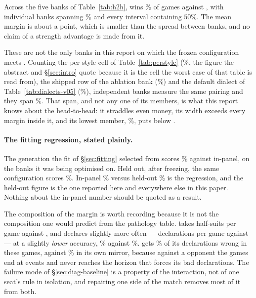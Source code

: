 Across the five banks of Table~\ref{tab:h2h}, \vfive{} wins \numHeadWin\% of
\numHeadGames{} games against \vfour{}, with individual banks spanning
\numHeadRange\% and every interval containing $50\%$. The mean margin is about a
point, which is smaller than the spread between banks, and no claim of a strength
advantage is made from it.

These are not the only banks in this report on which the frozen configuration
meets \vfour{}. Counting the per-style cell of Table~\ref{tab:perstyle}
(\numPanelVfiveVfour\%, the figure the abstract and \S\ref{sec:intro} quote
because it is the cell the worst case of that table is read from), the shipped
row of the ablation bank (\numAblFull\%) and the default dialect of
Table~\ref{tab:dialects-v05} (\numDialectDefault\%), \numHeadBanks{} independent
banks measure the same pairing and they span \numHeadBankSpan\%. That span, and
not any one of its members, is what this report knows about the head-to-head:
it straddles even money, its width exceeds every margin inside it, and its
lowest member, \numHeadBankLow\%, puts \vfive{} below \vfour{}.

\paragraph{The fitting regression, stated plainly.} The generation the fit of
\S\ref{sec:fitting} selected from scores \numFitWorst\% against \vfour{}
in-panel, on the banks it was being optimised on. Held out, after freezing, the
same configuration scores \numHeadWin\%. In-panel \numFitWorst\% versus held-out
\numHeadWin\% is the regression, and the held-out figure is the one reported
here and everywhere else in this paper. Nothing about the in-panel number should
be quoted as a result.

The composition of the margin is worth recording because it is not the
composition one would predict from the pathology table. \vfive{} takes
\numHeadSetsFive{} half-suits per game against \numHeadSetsFour{}, and declares
slightly more often --- \numHeadDeclRateFive{} declarations per game against
\numHeadDeclRateFour{} --- at a slightly \emph{lower} accuracy,
\numHeadDeclAccFive\% against \numHeadDeclAccFour\%. \vfour{} gets
\numHeadDeclErrFour\% of its declarations wrong in these games, against
\numFourDeclWrong\% in its own mirror, because against a \vfive{} opponent the
games end at \numHeadEvents{} events and \vfour{} never reaches the horizon that
forces its bad declarations.
The failure mode of \S\ref{sec:diag-baseline} is a property of the interaction,
not of one seat's rule in isolation, and repairing one side of the match removes
most of it from both.

